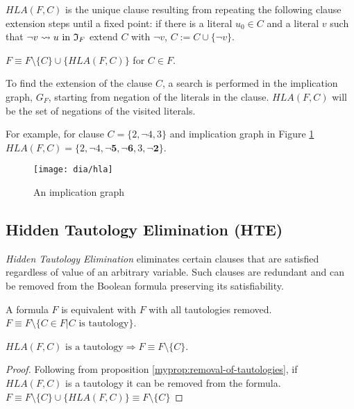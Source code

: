 \begin{mydef}
  $HLA(F, C)$ is the unique clause resulting from repeating the following
  clause extension steps until a fixed point: if there is a literal $u_0 \in C$
  and a literal $v$ such that $\neg v \rightsquigarrow u \text{ in } \mathfrak{I}_F$
  extend $C$ with $\neg v$, $C := C \cup \{ \neg v \}$.
\end{mydef}

\begin{myprop}
  $F \equiv F \setminus \{C\} \cup \{HLA(F, C)\}$ for $C \in F$.
\end{myprop}

To find the extension of the clause $C$, a search is performed in the
implication graph, $G_F$, starting from negation of the literals in
the clause. $HLA(F, C)$ will be the set of negations of the visited
literals.

For example, for clause $C = \{ 2, \neg 4, 3\}$
and implication graph in Figure \ref{fig:hla}
$HLA(F, C) = \{2, \neg 4, \mathbf{\neg 5, \neg 6}, 3, \mathbf{\neg 2} \}$.

\begin{figure}
  \centering
  \texttt{[image: dia/hla]}
  \caption{An implication graph}
  \label{fig:hla}
\end{figure}


\subsection{Hidden Tautology Elimination (HTE)}
\label{ssec:hte}

\emph{Hidden Tautology Elimination} eliminates certain clauses that
are satisfied regardless of value of an arbitrary variable. Such
clauses are redundant and can be removed from the Boolean formula
preserving its satisfiability.

\begin{myprop}[TE]
  \label{myprop:removal-of-tautologies}
  A formula $F$ is equivalent with $F$ with all tautologies removed.
  $F \equiv F \setminus \{ C \in F | C \text{ is tautology}\}$.
\end{myprop}

\begin{myprop}[HTE]
  $HLA(F, C) \text{ is a tautology} \Rightarrow F \equiv F \setminus \{C\}$.
\end{myprop}

\begin{proof}
  Following from proposition \ref{myprop:removal-of-tautologies},
  if $HLA(F, C)$ is a tautology it can be removed from the formula.
  $F \equiv F \setminus \{C\} \cup \{HLA(F, C)\} \equiv F \setminus \{C\}$
\end{proof}

